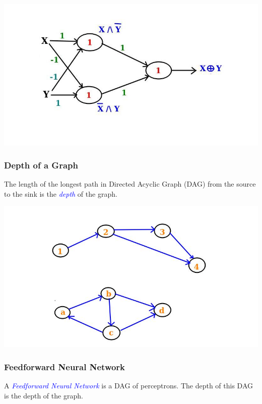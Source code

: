\documentclass[12pt,aspectratio=169]{beamer}
\begin{document}
\begin{frame}
\begin{center}
\includegraphics[scale=0.6]{nonlinear_xor}
\end{center}
\end{frame}

\begin{frame}
\frametitle{Depth of a Graph}
The length of the longest path in Directed Acyclic Graph (DAG) from the source to the sink is the \textcolor{blue}{\em depth} of the graph.
\end{frame}

\begin{frame}
\begin{center}
\includegraphics[scale=0.6]{depth}
\end{center}
\end{frame}

\begin{frame}
\frametitle{Feedforward Neural Network}
A \textcolor{blue}{\em Feedforward Neural Network} is a DAG of perceptrons. The depth of this DAG is the depth of the graph.
\end{frame}
\end{document}
